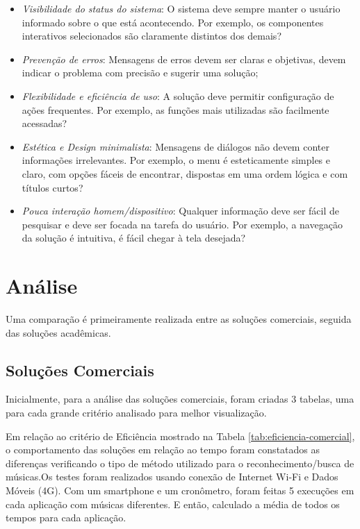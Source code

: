 \begin{itemize}
    \begin{itemize}
        \item \textit{Visibilidade do status do sistema}: O sistema deve sempre manter o usuário informado sobre o que está acontecendo. Por exemplo, os componentes interativos selecionados são claramente distintos dos demais?
        \item \textit{Prevenção de erros}: Mensagens de erros devem ser claras e objetivas, devem indicar o problema com precisão e sugerir uma solução;
        \item \textit{Flexibilidade e eficiência de uso}: A solução deve permitir configuração de ações frequentes. Por exemplo, as funções mais utilizadas são facilmente acessadas?
        \item \textit{Estética e Design minimalista}: Mensagens de diálogos não devem conter informações irrelevantes. Por exemplo, o menu é esteticamente simples e claro, com opções fáceis de encontrar, dispostas em uma ordem lógica e com títulos curtos?
        \item \textit{Pouca interação homem/dispositivo}: Qualquer informação deve ser fácil de pesquisar e deve ser focada na tarefa do usuário. Por exemplo, a navegação da solução é intuitiva, é fácil chegar à tela desejada?
    \end{itemize}
\end{itemize}


\section{Análise} \label{sec:analise}

Uma comparação é primeiramente realizada entre as soluções comerciais, seguida das soluções acadêmicas.

\subsection{Soluções Comerciais}

Inicialmente, para a análise das soluções comerciais, foram criadas 3 tabelas, uma para cada grande critério analisado para melhor visualização.

Em relação ao critério de Eficiência mostrado na Tabela \ref{tab:eficiencia-comercial}, o comportamento das soluções em relação ao tempo foram constatados as diferenças verificando o tipo de método utilizado para o reconhecimento/busca de músicas.Os testes foram realizados usando conexão de Internet Wi-Fi e Dados Móveis (4G). Com um smartphone e um cronômetro, foram feitas 5 execuções em cada aplicação com músicas diferentes. E então, calculado a média de todos os tempos para cada aplicação.

